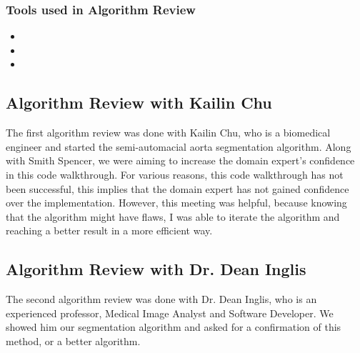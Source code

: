 \subsubsection{Tools used in Algorithm Review}


\begin{itemize}
\item 
\item 
\item 
\end{itemize}

\subsection{Algorithm Review with Kailin Chu}
The first algorithm review was done with Kailin Chu, who is a biomedical engineer and started the semi-automacial aorta segmentation algorithm. Along with Smith Spencer, we were aiming to increase the domain expert's confidence in this code walkthrough. For various reasons, this code walkthrough has not been successful, this implies that the domain expert has not gained confidence over the implementation. However, this meeting was helpful, because knowing that the algorithm might have flaws, I was able to iterate the algorithm and reaching a better result in a more efficient way.

\subsection{Algorithm Review with Dr. Dean Inglis}

The second algorithm review was done with Dr. Dean Inglis, who is an experienced professor, Medical Image Analyst and Software Developer. We showed him our segmentation algorithm and asked for a confirmation of this method, or a better algorithm.





